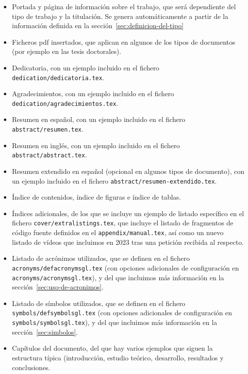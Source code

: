 \begin{itemize}

  \item Portada y página de información sobre el trabajo, que será dependiente del tipo de trabajo y la titulación. Se genera automáticamente a partir de la información definida en la sección~\ref{sec:definicion-del-tipo}

  \item Ficheros pdf insertados, que aplican en algunos de los tipos de documentos (por ejemplo en las tesis doctorales).

  \item Dedicatoria, con un ejemplo incluido en el fichero \texttt{dedication/dedicatoria.tex}.
  \item Agradecimientos, con un ejemplo incluido en el fichero \texttt{dedication/agradecimientos.tex}.


  \item Resumen en español, con un ejemplo incluido en el fichero \texttt{abstract/resumen.tex}.
  \item Resumen en inglés, con un ejemplo incluido en el fichero \texttt{abstract/abstract.tex}.
  \item Resumen extendido en español (opcional en algunos tipos de documento), con un ejemplo incluido en el fichero \texttt{abstract/resumen-extendido.tex}.

  \item Índice de contenidos, índice de figuras e índice de tablas.
  \item Índices adicionales, de los que se incluye un ejemplo de listado específico en el fichero \texttt{cover/extralistings.tex}, que incluye el listado de fragmentos de código fuente definidos en el \texttt{appendix/manual.tex}, así como un nuevo listado de vídeos que incluimos en 2023 tras una petición recibida al respecto.

  \item Listado de acrónimos utilizados, que se definen en el fichero \texttt{acronyms/defacronymsgl.tex} (con opciones adicionales de configuración en \texttt{acronyms/acronymsgl.tex}), y del que incluimos más información en la sección~\ref{sec:uso-de-acronimos}.
  \item Listado de símbolos utilizados, que se definen en el fichero \texttt{symbols/defsymbolsgl.tex} (con opciones adicionales de configuración en \texttt{symbols/symbolsgl.tex}), y del que incluimos más información en la sección~\ref{sec:simbolos}.


  \item Capítulos del documento, del que hay varios ejemplos que siguen la estructura típica (introducción, estudio teórico, desarrollo, resultados y conclusiones.


\end{itemize}
